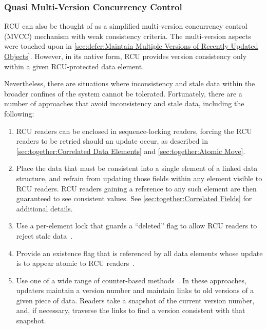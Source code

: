 \subsubsection{Quasi Multi-Version Concurrency Control}
\label{sec:defer:Quasi Multi-Version Concurrency Control}

RCU can also be thought of as a simplified multi-version concurrency
control (MVCC) mechanism with weak consistency criteria.
The multi-version aspects were touched upon in
\cref{sec:defer:Maintain Multiple Versions of Recently Updated Objects}.
However, in its native form, RCU provides version consistency only
within a given RCU-protected data element.

Nevertheless, there are situations where inconsistency and stale
data within the broader confines of the system cannot be tolerated.
Fortunately, there are a number of approaches that avoid inconsistency
and stale data, including the following:

\begin{enumerate}
\item	RCU readers can be enclosed in sequence-locking readers, forcing
	the RCU readers to be retried should an update occur,
	as described in
	\cref{sec:together:Correlated Data Elements}
	and
	\cref{sec:together:Atomic Move}.
\item	Place the data that must be consistent into a single element
	of a linked data structure, and refrain from updating those
	fields within any element visible to RCU readers.
	RCU readers gaining a reference to any such element are then
	guaranteed to see consistent values.
	See \cref{sec:together:Correlated Fields} for additional details.
\item	Use a per-element lock that guards a ``deleted'' flag to allow
	RCU readers to reject stale
	data~\cite{PaulEdwardMcKenneyPhD,Arcangeli03}.
\item	Provide an existence flag that is referenced by all data elements
	whose update is to appear atomic to RCU
	readers~\cite{PaulEMcKennneyAtomicTreeN4037,PaulEMcKennneyAtomicTreeCPPCON2014,PaulEMcKenneyIssaquahUpdate2015,PaulEMcKenney2016IssaquahACMApp,PaulEMcKenney2016IssaquahCPPCON}.
\item	Use one of a wide range of counter-based
	methods~\cite{PaulEMcKenney2008cyclicRCU,PaulEMcKenney2010cyclicRCU,PaulEMcKenney2011cyclicparallelRCU,PaulEMcKenney2014cyclicRCU,Matveev:2015:RLS:2815400.2815406,Kim:2019:MSR:3297858.3304040}.
	In these approaches, updaters maintain a version number and maintain links
	to old versions of a given piece of data.
	Readers take a snapshot of the current version number, and, if necessary,
	traverse the links to find a version consistent with that snapshot.
\end{enumerate}

